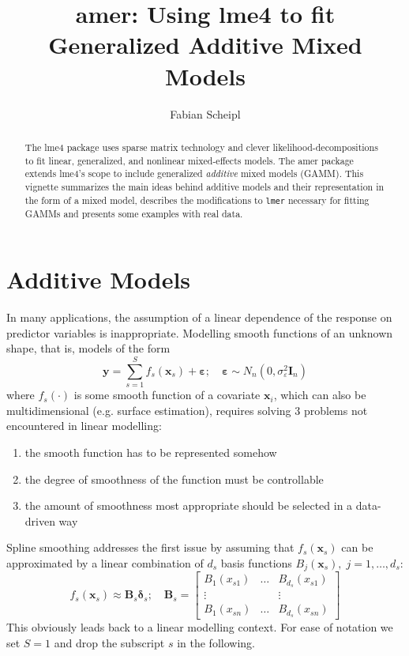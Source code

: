 \documentclass[12pt]{article}
\newcommand{\code}[1]{\texttt{\small{#1}}}
\newcommand{\package}[1]{\textsf{\small{#1}}}
\newcommand{\bmat}[1]{\left[\begin{array}{*{#1}{c}}}
\newcommand{\emat}{\end{array}\right]}
\newcommand{\eps}{\varepsilon}
\newcommand{\sigmaeps} {\sigma^2_{\eps}}
\begin{document}
\title{ \textsf{amer}: Using \textsf{lme4} to fit Generalized Additive Mixed Models}
\author{Fabian Scheipl}

\maketitle

\begin{abstract}
  The \package{lme4} package uses sparse matrix technology and clever likelihood-decompositions 
  to fit linear, generalized, and nonlinear mixed-effects models.  The \package{amer} package extends 
  \package{lme4}'s scope to include generalized \emph{additive} mixed models (GAMM). 
  This vignette summarizes the main ideas behind additive models and their representation in the form of a mixed model,
  describes the modifications to \code{lmer} necessary for fitting GAMMs and presents some examples with real data.
\end{abstract}
\newpage

\tableofcontents
\newpage

\section{Additive Models}
In many applications, the assumption of a linear dependence of the
response on predictor variables is inappropriate. Modelling smooth
functions of an unknown shape, that is, models of the form
\[
\bm y=\sum_{s=1}^S f_s(\bm x_s) +\bm\eps;\quad \bm\eps\sim N_n(0,\sigmaeps \bm I_n)
\]
where $f_s(\cdot)$ is some smooth function of a covariate $\bm x_i$,
which can also be multidimensional (e.g. surface estimation), requires solving 3 problems not
encountered in linear modelling:
\begin{enumerate}
	\item the smooth function has to be represented somehow
	\item the degree of smoothness of the function must be controllable
	\item the amount of smoothness most appropriate should be selected
in a data-driven way
\end{enumerate}

Spline smoothing addresses the first issue by assuming that $f_s(\bm x_s)$
can be approximated by a linear
combination of $d_s$ basis functions $B_j(\bm x_s),\; j =1,\dots,d_s$: 
\[
f_s(\bm x_s) \approx \bm B_s \bm \delta_s; \quad \bm B_s=\bmat{3} B_1(x_{s1}) & \hdots &
B_{d_s}(x_{s1}) \\ \vdots & & \vdots \\B_1(x_{sn}) & \hdots &
B_{d_s}(x_{sn}) \emat
\]
This obviously leads back to a linear modelling context. 
For ease of notation we set $S=1$ and drop the subscript $s$ in the following.
\end{document}
